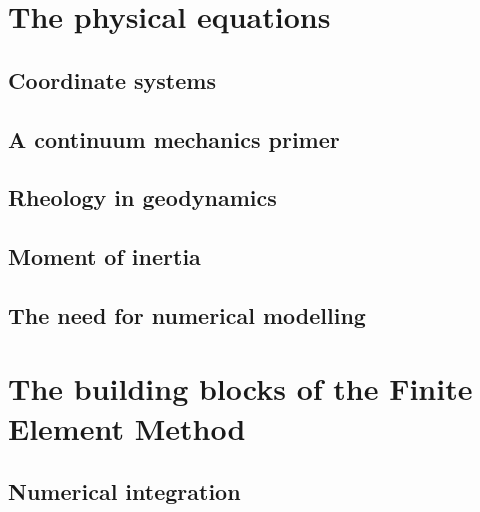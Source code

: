 \documentclass[a4paper]{article}
\numberwithin{equation}{section}
\begin{document}
\newpage
\section{The physical equations} %
\subsection{Coordinate systems}  \label{ss:coordsys} %
\subsection{A continuum mechanics primer} %
\subsection{Rheology in geodynamics}  %
\subsection{Moment of inertia} 
\subsection{The need for numerical modelling}

\newpage
\section{The building blocks of the Finite Element Method} %
\subsection{Numerical integration} \label{sec:quadrature} %
\end{document}
